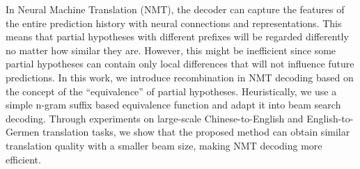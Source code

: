 In Neural Machine Translation (NMT), the decoder can capture the features of the entire prediction history with neural connections and representations. This means that partial hypotheses with different prefixes will be regarded differently no matter how similar they are. However, this might be inefficient since some partial hypotheses can contain only local differences that will not influence future predictions. In this work, we introduce recombination in NMT decoding based on the concept of the ``equivalence'' of partial hypotheses. Heuristically, we use a simple n-gram suffix based equivalence function and adapt it into beam search decoding. Through experiments on large-scale Chinese-to-English and English-to-Germen translation tasks, we show that the proposed method can obtain similar translation quality with a smaller beam size, making NMT decoding more efficient.
